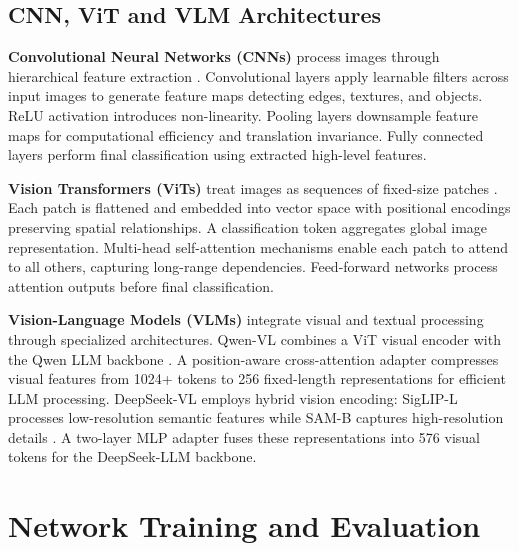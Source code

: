 \subsection{CNN, ViT and VLM Architectures}
\label{methods:neural_architectures}

\textbf{Convolutional Neural Networks (CNNs)} process images through hierarchical feature extraction \cite{lecun1998gradient}. Convolutional layers apply learnable filters across input images to generate feature maps detecting edges, textures, and objects. ReLU activation introduces non-linearity. Pooling layers downsample feature maps for computational efficiency and translation invariance. Fully connected layers perform final classification using extracted high-level features.

\textbf{Vision Transformers (ViTs)} treat images as sequences of fixed-size patches \cite{dosovitskiy2021image}. Each patch is flattened and embedded into vector space with positional encodings preserving spatial relationships. A classification token aggregates global image representation. Multi-head self-attention mechanisms enable each patch to attend to all others, capturing long-range dependencies. Feed-forward networks process attention outputs before final classification.

\textbf{Vision-Language Models (VLMs)} integrate visual and textual processing through specialized architectures. Qwen-VL combines a ViT visual encoder with the Qwen LLM backbone \cite{bai2023qwen}. A position-aware cross-attention adapter compresses visual features from 1024+ tokens to 256 fixed-length representations for efficient LLM processing. DeepSeek-VL employs hybrid vision encoding: SigLIP-L processes low-resolution semantic features while SAM-B captures high-resolution details \cite{zeng2024deepseek}. A two-layer MLP adapter fuses these representations into 576 visual tokens for the DeepSeek-LLM backbone.

\section{Network Training and Evaluation}
\label{methods:training}

